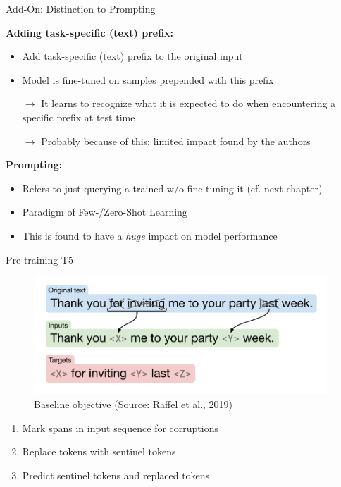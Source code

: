 \begin{frame}{Add-On: Distinction to Prompting}

\vfill

	\textbf{Adding task-specific (text) prefix:}

	\begin{itemize}
		\item Add task-specific (text) prefix to the original input
		\item Model is fine-tuned on samples prepended with this prefix
		\item[$\to$] It learns to recognize what it is expected to do when encountering a specific prefix at test time
		\item[$\to$] Probably because of this: limited impact found by the authors
	\end{itemize}
	
	\vspace{.5cm}

	\textbf{Prompting:}

	\begin{itemize}
		\item Refers to just querying a trained w/o fine-tuning it (cf. next chapter)
		\item Paradigm of Few-/Zero-Shot Learning
		\item This is found to have a \textit{huge} impact on model performance
	\end{itemize}
	
\vfill

\end{frame}


\begin{frame}{Pre-training T5}

\vfill
	
	\begin{figure}
		\centering
		\includegraphics[width = 11cm]{figure/63-t5-span-pred.png}\\ 
		\footnotesize{Baseline objective (Source:} \href{https://arxiv.org/pdf/1910.10683.pdf}{\footnotesize Raffel et al., 2019)}
	\end{figure}
	
	\begin{enumerate}
		\item Mark spans in input sequence for corruptions
		\item Replace tokens with sentinel tokens
		\item Predict sentinel tokens and replaced tokens
	\end{enumerate}
	
\vfill

\end{frame}

